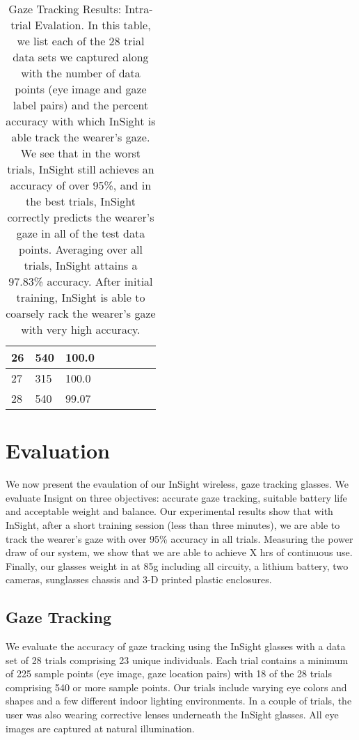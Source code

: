 \begin{center}
\begin{table}[t!]
\begin{tabular}{|l|l|l|l|l|l|l|l|}
      \hline
      26 & 540 & 100.0 \\ %
      \hline
      27 & 315 & 100.0 \\ %
      \hline
      28 & 540 & 99.07 \\ %
      \hline
   \end{tabular}
   \label{tab:gaze-individual}
   \caption{Gaze Tracking Results: Intra-trial Evalation.  In this table, we list each of the 28 trial data sets we captured along with the number of data points (eye image and gaze label pairs) and the percent accuracy with which InSight is able track the wearer's gaze.  We see that in the worst trials, InSight still achieves an accuracy of over 95\%, and in the best trials, InSight correctly predicts the wearer's gaze in all of the test data points.  Averaging over all trials, InSight attains a 97.83\% accuracy.  After initial training, InSight is able to coarsely rack the wearer's gaze with very high accuracy.}
\end{table}
\end{center}
\section{Evaluation}
\label{sec:eval}

We now present the evaulation of our InSight wireless, gaze tracking glasses.  We evaluate Insignt on three objectives: accurate gaze tracking, suitable battery life and acceptable weight and balance.  Our experimental results show that with InSight, after a short training session (less than three minutes), we are able to track the wearer's gaze with over 95\% accuracy in all trials.  Measuring the power draw of our system, we show that we are able to achieve X hrs of continuous use.  Finally, our glasses weight in at 85g including all circuity, a lithium battery, two cameras, sunglasses chassis and 3-D printed plastic enclosures.

\subsection{Gaze Tracking}

We evaluate the accuracy of gaze tracking using the InSight glasses with a data set of 28 trials comprising 23 unique individuals.  Each trial contains a minimum of 225 sample points (eye image, gaze location pairs) with 18 of the 28 trials comprising 540 or more sample points.  Our trials include varying eye colors and shapes and a few different indoor lighting environments.  In a couple of trials, the user was also wearing corrective lenses underneath the InSight glasses.  All eye images are captured at natural illumination.

